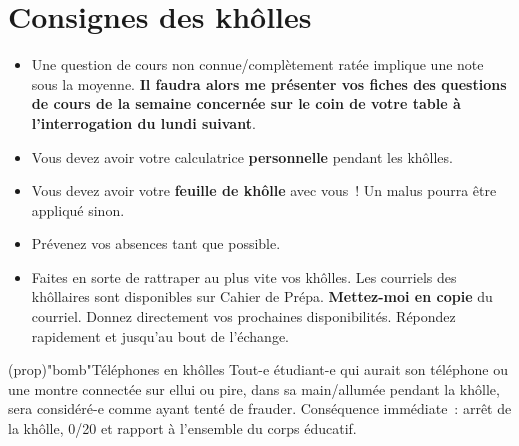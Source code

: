 \documentclass[a4paper, 12pt, final, garamond]{book}
\begin{document}
\setcounter{chapter}{0}

\chapter*{Consignes des khôlles}

\Large
\begin{itemize}
	\item Une question de cours non connue/complètement ratée implique une note
	      sous la moyenne. \textbf{Il faudra alors me présenter vos fiches des
		      questions de cours de la semaine concernée sur le coin de votre table à
		      l'interrogation du lundi suivant}.
	\item Vous devez avoir votre calculatrice \textbf{personnelle} pendant les
	      khôlles.
	\item Vous devez avoir votre \textbf{feuille de khôlle} avec vous~! Un malus
	      pourra être appliqué sinon.
	\item Prévenez vos absences tant que possible.
	\item Faites en sorte de rattraper au plus vite vos khôlles. Les courriels des
	      khôllaires sont disponibles sur Cahier de Prépa. \textbf{Mettez-moi en
		      copie} du courriel. Donnez directement vos prochaines disponibilités.
	      Répondez rapidement et jusqu'au bout de l'échange.
\end{itemize}

\begin{tcn}(prop)"bomb"{Téléphones en khôlles}
	Tout-e étudiant-e qui aurait son téléphone ou une montre connectée sur ellui
	ou pire, dans sa main/allumée pendant la khôlle, sera considéré-e comme ayant
	tenté de frauder.
	\bigbreak
	Conséquence immédiate~: arrêt de la khôlle, 0/20 et rapport à l'ensemble du
	corps éducatif.
\end{tcn}
\end{document}
